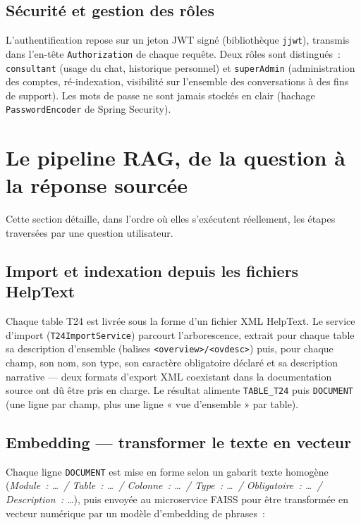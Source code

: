 ﻿\documentclass[12pt,a4paper]{report}
\newcommand{\code}[1]{\texttt{\color{biatbluedk}#1}}
\begin{document}
\section{Sécurité et gestion des rôles}
L'authentification repose sur un jeton JWT signé (bibliothèque \code{jjwt}), transmis dans l'en-tête \code{Authorization} de chaque requête. Deux rôles sont distingués~: \code{consultant} (usage du chat, historique personnel) et \code{superAdmin} (administration des comptes, ré-indexation, visibilité sur l'ensemble des conversations à des fins de support). Les mots de passe ne sont jamais stockés en clair (hachage \code{PasswordEncoder} de Spring Security).

\chapter{Le pipeline RAG, de la question à la réponse sourcée}
\label{ch:rag}

Cette section détaille, dans l'ordre où elles s'exécutent réellement, les étapes traversées par une question utilisateur.

\section{Import et indexation depuis les fichiers HelpText}
Chaque table T24 est livrée sous la forme d'un fichier XML HelpText. Le service d'import (\code{T24ImportService}) parcourt l'arborescence, extrait pour chaque table sa description d'ensemble (balises \code{<overview>/<ovdesc>}) puis, pour chaque champ, son nom, son type, son caractère obligatoire déclaré et sa description narrative --- deux formats d'export XML coexistant dans la documentation source ont dû être pris en charge. Le résultat alimente \code{TABLE\_T24} puis \code{DOCUMENT} (une ligne par champ, plus une ligne « vue d'ensemble » par table).

\section{Embedding --- transformer le texte en vecteur}
Chaque ligne \code{DOCUMENT} est mise en forme selon un gabarit texte homogène (\emph{Module~: \dots\ / Table~: \dots\ / Colonne~: \dots\ / Type~: \dots\ / Obligatoire~: \dots\ / Description~: \dots}), puis envoyée au microservice FAISS pour être transformée en vecteur numérique par un modèle d'embedding de phrases~:
\end{document}
